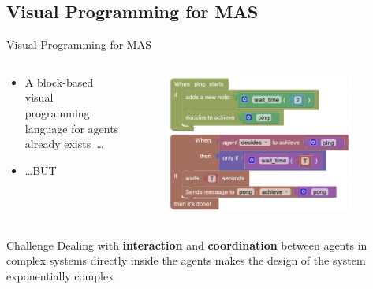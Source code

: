 \subsection{Visual Programming for MAS}
\begin{frame}{Visual Programming for MAS}
    \begin{columns}
        \begin{column}{0.5\textwidth}
            \begin{itemize}
                \item A block-based visual programming language for agents already exists~\cite{burattini2022agent}\dots
                \item \dots BUT
            \end{itemize}
        \end{column}
        \begin{column}{0.5\textwidth}
            \begin{figure}
                \centering
                \includegraphics[width=0.9\textwidth]{images/blocks-example.png}
            \end{figure}
        \end{column}
    \end{columns}

    \begin{block}{Challenge}
        Dealing with \textbf{interaction} and \textbf{coordination} between agents in complex systems directly inside the agents makes the design of the system exponentially complex
    \end{block}
\end{frame}
